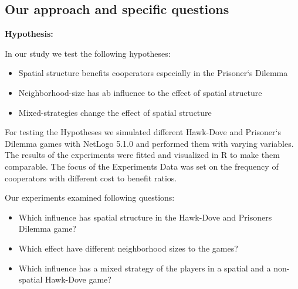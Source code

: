 \subsection{Our approach and specific questions}
\textbf{Hypothesis:}

In our study we test the following hypotheses: 

\begin{itemize}
\item Spatial structure benefits cooperators especially in the Prisoner`s Dilemma 
\item Neighborhood-size has ab influence to the effect of spatial structure
\item Mixed-strategies change the effect of spatial structure
\end{itemize}

For testing the Hypotheses we simulated different Hawk-Dove and Prisoner`s Dilemma games with NetLogo 5.1.0 and performed them with varying variables. The results of the experiments were fitted and visualized in R to make them comparable. The focus of the Experiments Data was set on the frequency of cooperators with different cost to benefit ratios.

Our experiments examined following questions:
\begin{itemize}
\item Which influence has spatial structure in the Hawk-Dove and Prisoners Dilemma game?
\item Which effect have different neighborhood sizes to the games?
\item Which influence has a mixed strategy of the players in a spatial and a non-spatial Hawk-Dove game?
\end{itemize}
